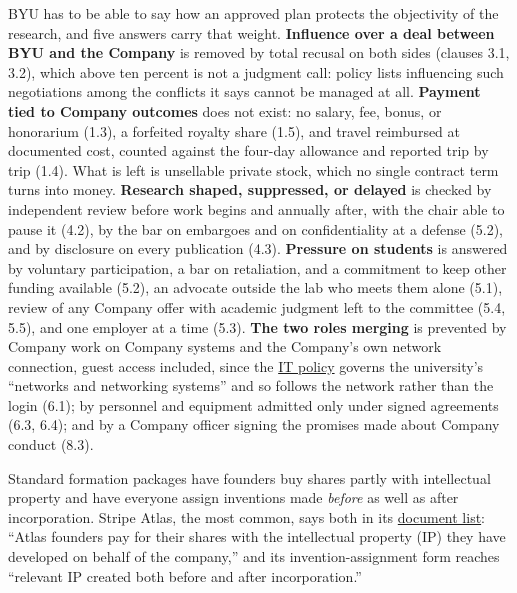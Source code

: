 \documentclass[11pt]{article}
\begin{document}
BYU has to be able to say how an approved plan protects the objectivity of the
research, and five answers carry that weight. \textbf{Influence over a deal
between BYU and the Company} is removed by total recusal on both sides (clauses
3.1, 3.2), which above ten percent is not a judgment call: policy lists
influencing such negotiations among the conflicts it says cannot be managed at
all. \textbf{Payment tied to Company outcomes} does not exist: no salary, fee,
bonus, or honorarium (1.3), a forfeited royalty share (1.5), and travel
reimbursed at documented cost, counted against the four-day allowance and
reported trip by trip (1.4). What is left is unsellable private stock, which no
single contract term turns into money. \textbf{Research shaped, suppressed, or
delayed} is checked by independent review before work begins and annually
after, with the chair able to pause it (4.2), by the bar on embargoes and on
confidentiality at a defense (5.2), and by disclosure on every publication
(4.3). \textbf{Pressure on students} is answered by voluntary participation, a bar
on retaliation, and a commitment to keep other funding available (5.2), an
advocate outside the lab who meets them alone (5.1), review of any Company
offer with academic judgment left to the committee (5.4, 5.5), and one
employer at a time (5.3).
\textbf{The two roles merging} is prevented by Company work on Company systems
and the Company's own network connection, guest access included, since the
\href{https://policy.byu.edu/view/appropriate-use-of-information-technology-resources-policy}{IT
policy} governs the university's ``networks and networking systems'' and so
follows the network rather than the login (6.1); by personnel and equipment
admitted only under signed agreements (6.3, 6.4); and by a Company officer
signing the promises made about Company conduct (8.3).


Standard formation packages have founders buy shares partly with intellectual
property and have everyone assign inventions made \emph{before} as well as
after incorporation. Stripe Atlas, the most common, says both in its
\href{https://docs.stripe.com/atlas/incorporation-documents}{document list}:
``Atlas founders pay for their shares with the intellectual property (IP) they
have developed on behalf of the company,'' and its invention-assignment form
reaches ``relevant IP created both before and after incorporation.''
\end{document}
